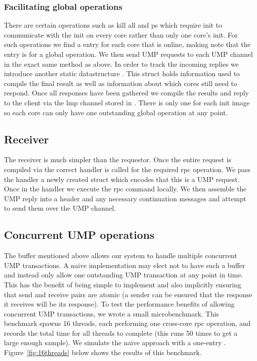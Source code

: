 \subsubsection{Facilitating global operations}
There are certain operations such as kill all and ps which require init to communicate with the init on every
core rather than only one core's init. For such operations we find a  entry for each core
that is online, making note that the entry is for a global operation. We then send UMP requests to each UMP channel in the exact same method as above.
In order to track the incoming replies we introduce another static datastructure . This struct 
holds information used to compile the final result as well as information about which cores still need to respond.
Once all responses have been gathered we compile the results and reply to the client via the lmp channel stored in
 . There is only one  for each init image so each core can only have one outstanding
 global operation at any point.

\subsection{Receiver}
\label{sec:receiver}
The receiver is much simpler than the requestor. Once the entire request is compiled via 
the correct handler is called for the required rpc operation. We pass the handler a newly created  struct
which encodes that this is a UMP request. Once in the handler we execute the rpc command locally. We then assemble the 
UMP reply into a header and any necessary continuation messages and attempt to send them over the UMP channel.


\subsection{Concurrent UMP operations}
\label{sec:ump-concurrent}
The  buffer mentioned above allows our system to handle multiple
concurrent UMP transactions. A naive implementation may elect not to have such a buffer and 
instead only allow one outstanding UMP transaction at any point in time. This has the benefit
of being simple to implement and also implicitly ensuring that send and receive pairs are atomic
 (a sender can be ensured that the response it receives will be its response). To test the performance
 benefits of allowing concurrent UMP transactions, we wrote a small microbenchmark. This benchmark
 spawns 16 threads, each performing one cross-core rpc operation, and records the total time
 for all threads to complete (this runs 50 times to get a large enough sample). We simulate the 
 naive approach with a one-entry . Figure~\ref{fig:16threads} below shows the results of this benchmark.

